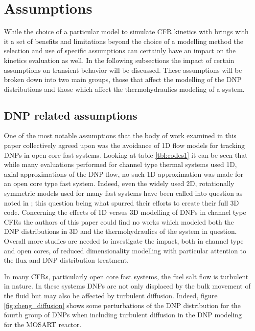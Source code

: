 \documentclass[review]{elsarticle}
\begin{document}
\section{Assumptions} \label{sec:asm}
While the choice of a particular model to simulate CFR kinetics with brings
with it a set of benefits and limitations beyond the choice of a modelling
method the selection and use of specific assumptions can certainly have an
impact on the kinetics evaluation as well. In the following subsections the
impact of certain assumptions on transient behavior will be discussed. These
assumptions will be broken down into two main groups, those that affect the
modelling of the DNP distributions and those which affect the thermohydraulics
modeling of a system.

\subsection{DNP related assumptions} \label{ssec:dnp_asm}
One of the most notable assumptions
that the body of work examined in this paper collectively agreed upon was the
avoidance of 1D flow models for tracking DNPs in open core fast systems. Looking
at table \ref{tbl:codes1} it can be seen that while many evaluations performed
for channel type thermal systems used 1D, axial approximations of the DNP
flow, no such 1D approximation was made for an open core type fast system.
Indeed, even the widely used 2D, rotationally symmetric models used for many
fast systems have been called into question as noted in
\cite{aufiero_development_2014}; this question being what spurred their efforts
to create their full 3D code. Concerning the effects of 1D versus 3D modelling
of DNPs in channel type CFRs the authors of this paper could find no works
which modeled both the DNP distributions in 3D and the thermohydraulics of
the system in question. Overall more studies are needed to investigate the
impact, both in channel type and open cores, of reduced dimensionality
modelling with particular attention to the flux and DNP distribution treatment.
\par In many CFRs, particularly open core fast systems, the fuel salt flow is
turbulent in nature. In these systems DNPs are not only displaced by the
bulk movement of the fluid but may also be affected by turbulent diffusion.
Indeed, figure \ref{fig:cheng_diffusion} shows some perturbations of the DNP
distribution for the fourth group of DNPs when including turbulent diffusion
in the DNP modeling for the MOSART reactor.
\end{document}

